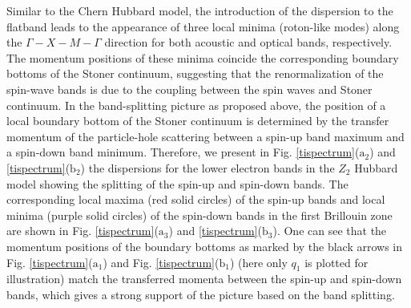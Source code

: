 \documentclass[amsmath,superscriptaddress,showpacs,aps,prb,twocolumn]{revtex4-1}
\begin{document}
\par Similar to the Chern Hubbard model, the introduction of the dispersion to the flatband leads to the appearance of three local minima (roton-like modes) along the $\Gamma-X-M-\Gamma$ direction for both acoustic and optical bands, respectively. The momentum positions of these minima coincide the corresponding boundary bottoms of the Stoner continuum, suggesting that the renormalization of the spin-wave bands is due to the coupling between the spin waves and Stoner continuum. In the band-splitting picture as proposed above, the position of a local boundary bottom of the Stoner continuum is determined by the transfer momentum of the particle-hole scattering between a spin-up band maximum and a spin-down band minimum. Therefore, we present in Fig. \ref{tispectrum}($\text{a}_2$) and \ref{tispectrum}($\text{b}_2$) the dispersions for the lower electron bands in the $Z_2$ Hubbard model showing the splitting of the spin-up and spin-down bands. The corresponding local maxima (red solid circles) of the spin-up bands and local minima (purple solid circles) of the spin-down bands in the first Brillouin zone are shown in Fig. \ref{tispectrum}($\text{a}_3$) and \ref{tispectrum}($\text{b}_3$). One can see that the momentum positions of the boundary bottoms as marked by the black arrows in Fig. \ref{tispectrum}($\text{a}_1$) and Fig. \ref{tispectrum}($\text{b}_1$) (here only $q_1$ is plotted for illustration) match the transferred momenta between the spin-up and spin-down bands, which gives a strong support of the picture based on the band splitting.
\end{document}
